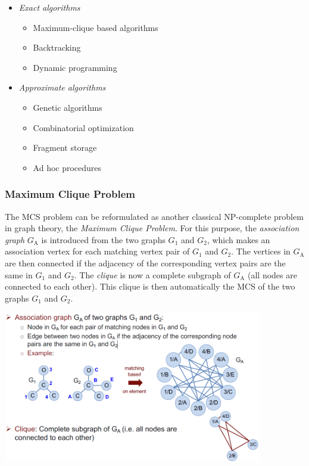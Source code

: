 \begin{itemize}
    \item \emph{Exact algorithms}
    \begin{itemize}
        \item Maximum-clique based algorithms
        \item Backtracking
        \item Dynamic programming
    \end{itemize}
    \item \emph{Approximate algorithms}
    \begin{itemize}
        \item Genetic algorithms
        \item Combinatorial optimization
        \item Fragment storage
        \item Ad hoc procedures
    \end{itemize}
\end{itemize}

\subsubsection{Maximum Clique Problem}

The MCS problem can be reformulated as another classical NP-complete problem in graph theory, the \emph{Maximum Clique Problem}. For this purpose, the \emph{association graph} $G_\mathrm{A}$ is introduced from the two graphs $G_1$ and $G_2$, which makes an association vertex for each matching vertex pair of $G_1$ and $G_2$. The vertices in $G_\mathrm{A}$ are then connected if the adjacency of the corresponding vertex pairs are the same in $G_1$ and $G_2$. The \emph{clique} is now a complete subgraph of $G_\mathrm{A}$ (all nodes are connected to each other). This clique is then automatically the MCS of the two graphs $G_1$ and $G_2$.

\begin{center}\includegraphics[width=0.85\textwidth]{img/cheminformatics/McsAssociationGraph.png}\end{center}

